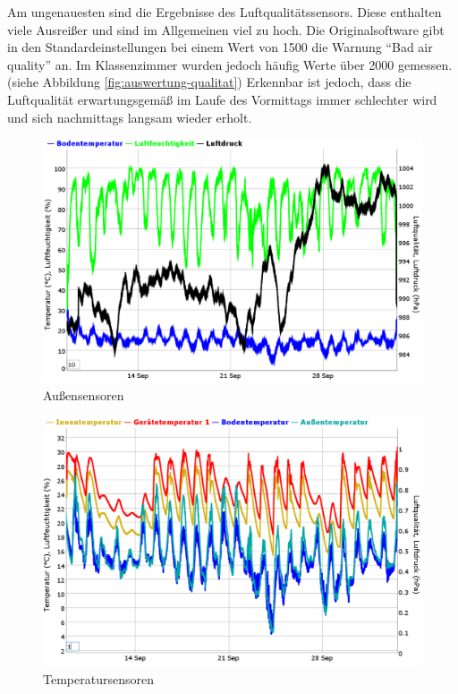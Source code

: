 Am ungenauesten sind die Ergebnisse des Luftqualitätssensors. Diese enthalten viele Ausreißer und sind im Allgemeinen viel zu hoch. Die Originalsoftware gibt in den Standardeinstellungen bei einem Wert von 1500 die Warnung \enquote{Bad air quality} an. Im Klassenzimmer wurden jedoch häufig Werte über 2000 gemessen. (siehe Abbildung \ref{fig:auswertung-qualitat}) Erkennbar ist jedoch, dass die Luftqualität erwartungsgemäß im Laufe des Vormittags immer  schlechter wird und sich nachmittags langsam wieder erholt. 

\begin{figure}[p]
  \centering
     \includegraphics[width=0.95\textheight, angle=90]{figures/auswertung-aussen.png}
  \caption{Außensensoren}
  \label{fig:auswertung-aussen}
\end{figure}

\begin{figure}[p]
  \centering
     \includegraphics[width=0.95\textheight, angle=90]{figures/auswertung-temperaturen.png}
  \caption{Temperatursensoren}
  \label{fig:auswertung-temperaturen}
\end{figure}

